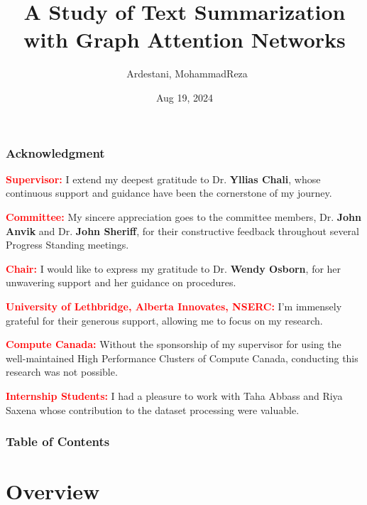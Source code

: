 \documentclass{beamer}
\title[Master's Thesis] %
{A Study of Text Summarization with Graph Attention Networks}
\author[Ardestani, Reza] %
{~Ardestani, MohammadReza\inst{1} }
\institute[] %
{
  \inst{1}%
  Department of Computer Science\\
  University of Lethbridge\\
  ardestani@uleth.ca
}
\date[Aug 2024] %
{Aug 19, 2024}
\begin{document}
\frame{\titlepage}




\begin{frame}
\frametitle{Acknowledgment}
\textcolor{red}{\textbf{Supervisor:}} I extend my deepest gratitude to Dr. \textbf{Yllias Chali}, whose continuous support and guidance have been the cornerstone of my journey.\vspace{5px}

\textcolor{red}{\textcolor{red}{\textbf{Committee:}}} My sincere appreciation goes to the committee members, Dr. \textbf{John Anvik} and Dr. \textbf{John Sheriff}, for their constructive feedback throughout several Progress Standing meetings.\vspace{5px}

\textcolor{red}{\textbf{Chair:}} I would like to express my gratitude to Dr. \textbf{Wendy Osborn}, for her unwavering support and her guidance on procedures.\vspace{5px}

\textcolor{red}{\textbf{University of Lethbridge, Alberta Innovates, NSERC:}} I'm immensely grateful for their generous support, allowing me to focus on my research.\vspace{5px}

\textcolor{red}{\textbf{Compute Canada:}} Without the sponsorship of my supervisor for using the well-maintained High Performance Clusters of Compute Canada, conducting this research was not possible.

\textcolor{red}{\textbf{Internship Students:}} I had a pleasure to work with Taha Abbass and Riya Saxena whose contribution to the dataset processing were valuable.





\end{frame}


\begin{frame}
\frametitle{Table of Contents}
\tableofcontents
\end{frame}


\section{Overview}
\end{document}

